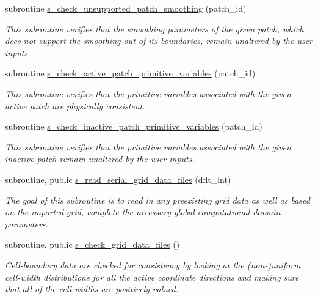 \begin{DoxyCompactItemize}
subroutine \hyperlink{namespacem__start__up_a9ec1a8955422d87dddd1ad55f99fb9b8}{s\+\_\+check\+\_\+unsupported\+\_\+patch\+\_\+smoothing} (patch\+\_\+id)
\begin{DoxyCompactList}\small\item\em This subroutine verifies that the smoothing parameters of the given patch, which does not support the smoothing out of its boundaries, remain unaltered by the user inputs. \end{DoxyCompactList}\item 
subroutine \hyperlink{namespacem__start__up_a2650f87062992def80eb084ff2c0913b}{s\+\_\+check\+\_\+active\+\_\+patch\+\_\+primitive\+\_\+variables} (patch\+\_\+id)
\begin{DoxyCompactList}\small\item\em This subroutine verifies that the primitive variables associated with the given active patch are physically consistent. \end{DoxyCompactList}\item 
subroutine \hyperlink{namespacem__start__up_a3242a22615c7f69033b53d51df04ad02}{s\+\_\+check\+\_\+inactive\+\_\+patch\+\_\+primitive\+\_\+variables} (patch\+\_\+id)
\begin{DoxyCompactList}\small\item\em This subroutine verifies that the primitive variables associated with the given inactive patch remain unaltered by the user inputs. \end{DoxyCompactList}\item 
subroutine, public \hyperlink{namespacem__start__up_ac2be28e53607458a3860b03446ed6497}{s\+\_\+read\+\_\+serial\+\_\+grid\+\_\+data\+\_\+files} (dflt\+\_\+int)
\begin{DoxyCompactList}\small\item\em The goal of this subroutine is to read in any preexisting grid data as well as based on the imported grid, complete the necessary global computational domain parameters. \end{DoxyCompactList}\item 
subroutine, public \hyperlink{namespacem__start__up_a1d2e9e9354b18d2aab09e673b04032ef}{s\+\_\+check\+\_\+grid\+\_\+data\+\_\+files} ()
\begin{DoxyCompactList}\small\item\em Cell-\/boundary data are checked for consistency by looking at the (non-\/)uniform cell-\/width distributions for all the active coordinate directions and making sure that all of the cell-\/widths are positively valued. \end{DoxyCompactList}\item 

\end{DoxyCompactItemize}
